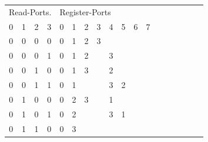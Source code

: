 \begin{table}[htbp]
\begin{minipage}{.5\textwidth}
		\begin{tabular}{cccccccccccccccccc}
			\multicolumn{4}{l}{Read-Ports.}                 & \multicolumn{8}{|l}{Register-Ports}                                                               \\ 
			\multicolumn{1}{c}{0} & \multicolumn{1}{c}{1} & \multicolumn{1}{c}{2} & \multicolumn{1}{c}{3} & \multicolumn{1}{|c}{0} & \multicolumn{1}{c}{1} & \multicolumn{1}{c}{2}& \multicolumn{1}{c}{3} &
			\multicolumn{1}{c}{4} & \multicolumn{1}{c}{5} & \multicolumn{1}{c}{6}& \multicolumn{1}{c}{7} \\
			\hline
			\multicolumn{1}{c}{0} & \multicolumn{1}{c}{0} & \multicolumn{1}{c}{0} & \multicolumn{1}{c}{0} & \multicolumn{1}{|c}{0} & \multicolumn{1}{c}{1} & \multicolumn{1}{c}{2}& \multicolumn{1}{c}{3} &
			\multicolumn{1}{c}{} & \multicolumn{1}{c}{} & \multicolumn{1}{c}{}& \multicolumn{1}{c}{} \\
			\multicolumn{1}{c}{0} & \multicolumn{1}{c}{0} & \multicolumn{1}{c}{0} & \multicolumn{1}{c}{1} & \multicolumn{1}{|c}{0} & \multicolumn{1}{c}{1} & \multicolumn{1}{c}{2}& \multicolumn{1}{c}{} &
			\multicolumn{1}{c}{3} & \multicolumn{1}{c}{} & \multicolumn{1}{c}{}& \multicolumn{1}{c}{} \\
			\multicolumn{1}{c}{0} & \multicolumn{1}{c}{0} & \multicolumn{1}{c}{1} & \multicolumn{1}{c}{0} & \multicolumn{1}{|c}{0} & \multicolumn{1}{c}{1} & \multicolumn{1}{c}{3}& \multicolumn{1}{c}{} &
			\multicolumn{1}{c}{2} & \multicolumn{1}{c}{} & \multicolumn{1}{c}{}& \multicolumn{1}{c}{} \\
			\multicolumn{1}{c}{0} & \multicolumn{1}{c}{0} & \multicolumn{1}{c}{1} & \multicolumn{1}{c}{1} & \multicolumn{1}{|c}{0} & \multicolumn{1}{c}{1} & \multicolumn{1}{c}{}& \multicolumn{1}{c}{} &
			\multicolumn{1}{c}{3} & \multicolumn{1}{c}{2} & \multicolumn{1}{c}{}& \multicolumn{1}{c}{} \\
			\multicolumn{1}{c}{0} & \multicolumn{1}{c}{1} & \multicolumn{1}{c}{0} & \multicolumn{1}{c}{0} & \multicolumn{1}{|c}{0} & \multicolumn{1}{c}{2} & \multicolumn{1}{c}{3}& \multicolumn{1}{c}{} &
			\multicolumn{1}{c}{1} & \multicolumn{1}{c}{} & \multicolumn{1}{c}{}& \multicolumn{1}{c}{} \\
			\multicolumn{1}{c}{0} & \multicolumn{1}{c}{1} & \multicolumn{1}{c}{0} & \multicolumn{1}{c}{1} & \multicolumn{1}{|c}{0} & \multicolumn{1}{c}{2} & \multicolumn{1}{c}{}& \multicolumn{1}{c}{} &
			\multicolumn{1}{c}{3} & \multicolumn{1}{c}{1} & \multicolumn{1}{c}{}& \multicolumn{1}{c}{} \\
			\multicolumn{1}{c}{0} & \multicolumn{1}{c}{1} & \multicolumn{1}{c}{1} & \multicolumn{1}{c}{0} & \multicolumn{1}{|c}{0} & \multicolumn{1}{c}{3} & \multicolumn{1}{c}{}& \multicolumn{1}{c}{} &

\end{tabular}
\end{minipage}
\end{table}
